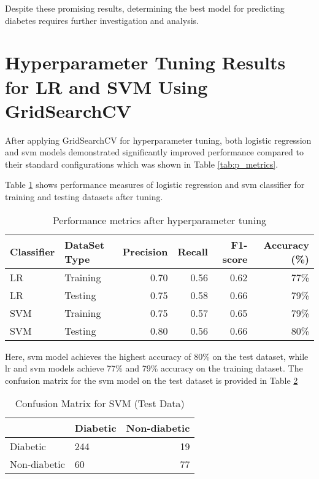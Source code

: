 Despite these promising results, determining the best model for predicting diabetes requires further investigation and analysis.

\section{Hyperparameter Tuning Results for LR and SVM Using GridSearchCV}
After applying GridSearchCV for hyperparameter tuning, both logistic regression and svm models demonstrated significantly improved performance compared to their standard configurations which was shown in Table \ref{tab:p_metrics}. 

Table \ref{tab:gs_p_metrics} shows performance measures of logistic regression and svm classifier for training and testing datasets after tuning.

\begin{table}[h!]
    \centering
    \caption{Performance metrics after hyperparameter tuning}
    \label{tab:gs_p_metrics}
    \begin{tabular}{llrrrr}     
        \toprule
        Classifier  &   DataSet Type &   Precision   &   Recall  &   F1-score    &   Accuracy (\%) \\
        \midrule
        LR  &   Training    &   0.70   &   0.56   &   0.62    &   77\%   \\
        LR  &   Testing &   0.75   &   0.58   &   0.66    &   79\%   \\
        SVM  &   Training    &   0.75   &   0.57   &   0.65    &   79\%   \\
        SVM  &   Testing &   0.80   &   0.56   &   0.66    &   80\%   \\
        \bottomrule
    \end{tabular}
\end{table}

Here, svm model achieves the highest accuracy of 80\% on the test dataset, while lr and svm models achieve 77\% and 79\% accuracy on the training dataset. The confusion matrix for the svm model on the test dataset is provided in Table \ref{tab:gs_conf_matrix}

\begin{table}[h!]
    \centering
    \caption{Confusion Matrix for SVM (Test Data)}
    \label{tab:gs_conf_matrix}
    \begin{tabular}{llr}     
        \toprule
        & Diabetic  &   Non-diabetic \\
        \midrule
        Diabetic &  244  &   19   \\
        Non-diabetic &  60    &   77  \\
        \bottomrule
    \end{tabular}
\end{table}

